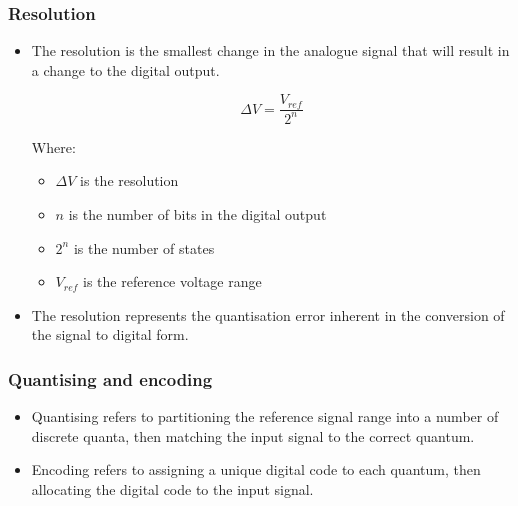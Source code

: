 \documentclass[11pt]{article}
\begin{document}
\subsubsection{Resolution}
\label{sec:orgf388a60}
\begin{itemize}
\item The resolution is the smallest change in the analogue signal that will result in a change to the digital output.

\[\Delta V = \frac{V_{ref}}{2^n}\]

Where:
\begin{itemize}
\item \(\Delta V\) is the resolution
\item \(n\) is the number of bits in the digital output
\item \(2^n\) is the number of states
\item \(V_{ref}\) is the reference voltage range
\end{itemize}

\item The resolution represents the quantisation error inherent in the conversion of the signal to digital form.
\end{itemize}

 \newpage
\subsubsection{Quantising and encoding}
\label{sec:orgf2faf4f}
\begin{itemize}
\item Quantising refers to partitioning the reference signal range into a number of discrete quanta, then matching the input signal to the correct quantum.
\item Encoding refers to assigning a unique digital code to each quantum, then allocating the digital code to the input signal.
\end{itemize}
\end{document}
